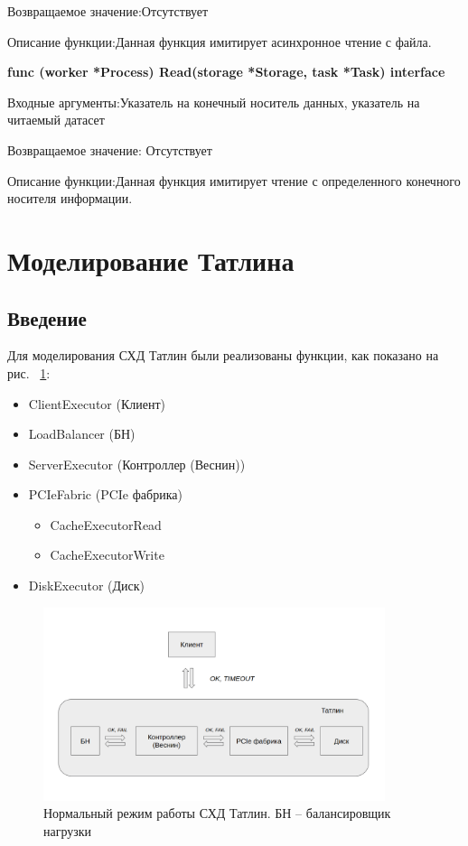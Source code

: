 Возвращаемое значение:Отсутствует

Описание функции:Данная функция имитирует асинхронное чтение с файла. 

\textbf{func (worker *Process) Read(storage *Storage, task *Task) interface}

Входные аргументы:Указатель на конечный носитель данных, указатель на читаемый датасет

Возвращаемое значение: Отсутствует

Описание функции:Данная функция имитирует чтение с определенного конечного носителя информации.

\section{Моделирование Татлина}\label{Tatlin}
\subsection{Введение}

Для моделирования СХД Татлин были реализованы функции, как показано на рис.  ~\ref{fig:norm-tatlin}:

\begin{itemize}
\item ClientExecutor (Клиент) 
\item LoadBalancer (БН)
\item ServerExecutor (Контроллер (Веснин))
\item PCIeFabric (PCIe фабрика)
\begin{itemize}
\item CacheExecutorRead
\item CacheExecutorWrite
\end{itemize}
\item DiskExecutor (Диск)
\end{itemize}

\begin{figure}[!ht]
\centering
\includegraphics[width=10cm]{Kenenbek/images/norm.png}
\caption{Нормальный режим работы СХД Татлин. БН -- балансировщик нагрузки}
\label{fig:norm-tatlin}
\end{figure}

